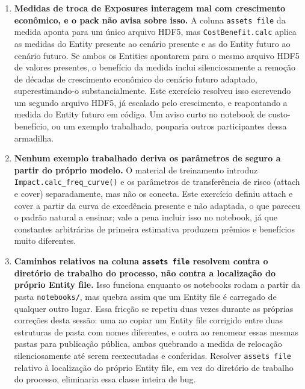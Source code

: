 \documentclass[11pt]{article}
\begin{document}
\begin{enumerate}
\item \textbf{Medidas de troca de Exposures interagem mal com crescimento econômico, e o
pack não avisa sobre isso.} A coluna \texttt{assets file} da medida aponta para um único
arquivo HDF5, mas \texttt{CostBenefit.calc} aplica as medidas do Entity presente ao
cenário presente e as do Entity futuro ao cenário futuro. Se ambos os Entities apontarem
para o mesmo arquivo HDF5 de valores presentes, o benefício da medida inclui silenciosamente
a remoção de décadas de crescimento econômico do cenário futuro adaptado, superestimando-o
substancialmente. Este exercício resolveu isso escrevendo um segundo arquivo HDF5, já
escalado pelo crescimento, e reapontando a medida do Entity futuro em código. Um aviso
curto no notebook de custo-benefício, ou um exemplo trabalhado, pouparia outros
participantes dessa armadilha.

\item \textbf{Nenhum exemplo trabalhado deriva os parâmetros de seguro a partir do próprio
modelo.} O material de treinamento introduz \texttt{Impact.calc\_freq\_curve()} e os
parâmetros de transferência de risco (attach e cover) separadamente, mas não os conecta.
Este exercício definiu attach e cover a partir da curva de excedência presente e não
adaptada, o que pareceu o padrão natural a ensinar; vale a pena incluir isso no notebook,
já que constantes arbitrárias de primeira estimativa produzem prêmios e benefícios muito
diferentes.

\item \textbf{Caminhos relativos na coluna \texttt{assets file} resolvem contra o diretório
de trabalho do processo, não contra a localização do próprio Entity file.} Isso funciona
enquanto os notebooks rodam a partir da pasta \texttt{notebooks/}, mas quebra assim que um
Entity file é carregado de qualquer outro lugar. Essa fricção se repetiu duas vezes durante
as próprias correções desta sessão: uma ao copiar um Entity file corrigido entre duas
estruturas de pasta com nomes diferentes, e outra ao renomear essas mesmas pastas para
publicação pública, ambas quebrando a medida de relocação silenciosamente até serem
reexecutadas e conferidas. Resolver \texttt{assets file} relativo à localização do próprio
Entity file, em vez do diretório de trabalho do processo, eliminaria essa classe inteira
de bug.


\end{enumerate}
\end{document}
